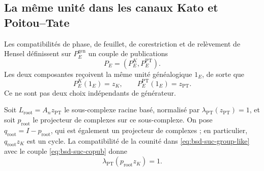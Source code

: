 \subsection*{La même unité dans les canaux Kato et Poitou--Tate}

Les compatibilités de phase, de feuillet, de corestriction et de relèvement de Hensel
définissent sur \(P_E^{\mathrm{gen}}\) un couple de publications
\begin{equation}\label{eq:bsd-suc-copub}
 P_E=(P_E^{K},P_E^{\mathrm{PT}}).
\end{equation}
Les deux composantes reçoivent la même unité généalogique \(1_E\), de sorte
que
\begin{equation}\label{eq:bsd-suc-zk-zpt}
 P_E^{K}(1_E)=z_K,
 \qquad P_E^{\mathrm{PT}}(1_E)=z_{\mathrm{PT}}.
\end{equation}
Ce ne sont pas deux choix indépendants de générateur.

Soit \(L_{\mathrm{root}}=A_n z_{\mathrm{PT}}\) le sous-complexe racine basé,
normalisé par
\(\lambda_{\mathrm{PT}}(z_{\mathrm{PT}})=1\), et soit
\(p_{\mathrm{root}}\) le projecteur de complexes sur ce sous-complexe. On pose
\(q_{\mathrm{root}}=I-p_{\mathrm{root}}\), qui est également un projecteur de
complexes ; en particulier, \(q_{\mathrm{root}}z_K\) est un cycle. La compatibilité de la
counité dans \eqref{eq:bsd-suc-group-like} avec le couple
\eqref{eq:bsd-suc-copub} donne
\begin{equation}\label{eq:bsd-suc-normalizacion-raiz}
 \lambda_{\mathrm{PT}}(p_{\mathrm{root}}z_K)=1.
\end{equation}

